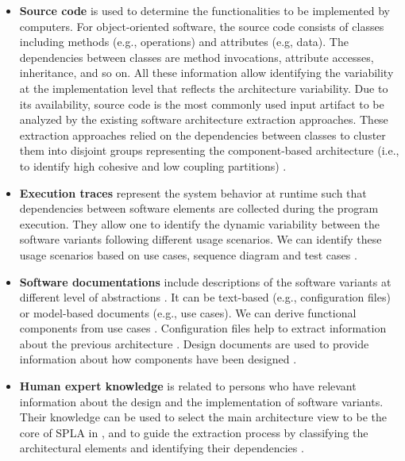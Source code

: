 \documentclass[graybox]{svmult}
\begin{document}
\begin{itemize}
	\item \textbf{Source code} is used to determine the functionalities to be implemented by computers. For object-oriented software, the source code consists of classes including methods (e.g., operations) and attributes (e.g, data). The dependencies between classes are method invocations, attribute accesses, inheritance, and so on. All these information allow identifying the variability at the implementation level that reflects the architecture variability. Due to its availability, source code is the most commonly used input artifact to be analyzed by the existing software architecture extraction approaches. These extraction approaches relied on the dependencies between classes to cluster them into disjoint groups representing the component-based architecture (i.e., to identify high cohesive and low coupling partitions) \cite{mende2008supporting,mende2009evaluation,moshkenani2012improving}. 
	
    \item \textbf{Execution traces} represent the system behavior at runtime such that dependencies between software elements are collected during the program execution. They allow one to identify the dynamic variability  between the software variants following different usage scenarios. We can identify these  usage scenarios based on use cases, sequence diagram and test cases \cite{Dugerdil:2013:DDT:2480362.2480602,mishra2009creating,shatnawi2018identifying}. 
    
	\item \textbf{Software documentations} include descriptions of the software variants at different level of abstractions \cite{lethbridge2003software}. It can be text-based (e.g., configuration files) or model-based documents (e.g., use cases). We can derive functional components from use cases \cite{shatnawi2018identifying}. Configuration files help to extract information about the previous architecture \cite{Weinreich2012}. Design documents are used to provide information about how components have been designed \cite{kolb2006refactoring}. 
	
	\item \textbf{Human expert knowledge} is related to persons who have relevant information about the design and the implementation of software variants. Their knowledge can be used to select the main architecture view to be the core of SPLA in \cite{pinzger2004architecture}, and to guide the extraction process by classifying the architectural elements and identifying their dependencies \cite{kang2005feature}. 
\end{itemize}
\end{document}
